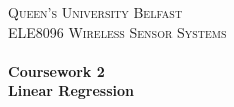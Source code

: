 
\begin{titlepage}

    \begin{center}
    
    
    \textsc{\LARGE Queen's University Belfast}\\[1.5cm]
    
    \textsc{\Large ELE8096 Wireless Sensor Systems}\\[0.5cm]
    
    
    \HRule \\[1cm]
    { \huge \bfseries Coursework 2}\\[0.5cm]
    { \huge \bfseries Linear Regression}\\[0.5cm]
    \HRule \\[1.5cm]
    

\end{center}
\end{titlepage}
